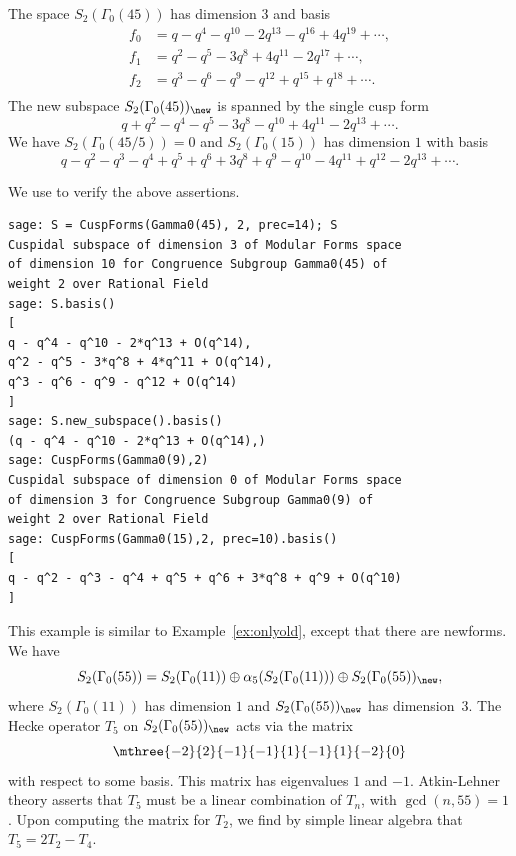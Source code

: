 \begin{example}\label{ex:new_old}
The space $S_2(\Gamma_0(45))$ has dimension $3$ and basis
\begin{align*}
f_{0} &= q - q^{4} - q^{10} - 2q^{13} - q^{16} + 4q^{19} + \cdots, \\
f_{1} &= q^{2} - q^{5} - 3q^{8} + 4q^{11} - 2q^{17} + \cdots, \\
f_{2} &= q^{3} - q^{6} - q^{9} - q^{12} + q^{15} + q^{18} + \cdots. \\
\end{align*}
The new subspace $S_2(\Gamma_0(45))_{\new}$ is spanned by the single cusp form
$$
q + q^{2} - q^{4} - q^{5} - 3q^{8} - q^{10} + 4q^{11} - 2q^{13} + \cdots.
$$
We have $S_2(\Gamma_0(45/5)) = 0$ and $S_2(\Gamma_0(15))$ 
has dimension $1$ with basis
$$
q - q^{2} - q^{3} - q^{4} + q^{5} + q^{6} + 3q^{8} + q^{9} - q^{10} - 4q^{11} + q^{12} - 2q^{13} + \cdots.
$$

We use \sage{} to verify the above assertions.
\begin{verbatim}
sage: S = CuspForms(Gamma0(45), 2, prec=14); S
Cuspidal subspace of dimension 3 of Modular Forms space 
of dimension 10 for Congruence Subgroup Gamma0(45) of 
weight 2 over Rational Field
sage: S.basis()
[
q - q^4 - q^10 - 2*q^13 + O(q^14),
q^2 - q^5 - 3*q^8 + 4*q^11 + O(q^14),
q^3 - q^6 - q^9 - q^12 + O(q^14)
]
sage: S.new_subspace().basis()
(q - q^4 - q^10 - 2*q^13 + O(q^14),)
sage: CuspForms(Gamma0(9),2)
Cuspidal subspace of dimension 0 of Modular Forms space 
of dimension 3 for Congruence Subgroup Gamma0(9) of 
weight 2 over Rational Field
sage: CuspForms(Gamma0(15),2, prec=10).basis()
[
q - q^2 - q^3 - q^4 + q^5 + q^6 + 3*q^8 + q^9 + O(q^10)
]
\end{verbatim}
\end{example}

\begin{example}
This example is similar to Example~\ref{ex:onlyold}, except that there
are newforms.
We have
$$
  S_2(\Gamma_0(55)) = S_2(\Gamma_0(11)) \oplus \alpha_5(S_2(\Gamma_0(11)))
                     \oplus S_2(\Gamma_0(55))_{\new},
$$
where $S_2(\Gamma_0(11))$ has dimension $1$ and
$S_2(\Gamma_0(55))_{\new}$ has dimension~$3$.
The Hecke operator $T_5$ on 
$S_2(\Gamma_0(55))_{\new}$ acts  via the matrix
$$
\mthree
{-2}{\hfill 2}{\hfill -1}
{-1}{\hfill 1}{-1}
{\hfill 1}{-2}{\hfill 0}
$$
with respect to some basis.
This matrix has eigenvalues $1$ and $-1$.
Atkin-Lehner theory asserts that $T_5$ must be a
linear combination of $T_n$, with 
$\gcd(n,55)=1$.
Upon computing the matrix for $T_2$,
we find by simple linear algebra that $T_5 = 2T_2 - T_4$.
\end{example}





